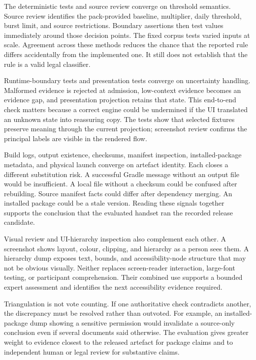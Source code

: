 The deterministic tests and source review converge on threshold semantics. Source review identifies the pack-provided baseline, multiplier, daily threshold, burst limit, and source restrictions. Boundary assertions then test values immediately around those decision points. The fixed corpus tests varied inputs at scale. Agreement across these methods reduces the chance that the reported rule differs accidentally from the implemented one. It still does not establish that the rule is a valid legal classifier.

Runtime-boundary tests and presentation tests converge on uncertainty handling. Malformed evidence is rejected at admission, low-context evidence becomes an evidence gap, and presentation projection retains that state. This end-to-end check matters because a correct engine could be undermined if the UI translated an unknown state into reassuring copy. The tests show that selected fixtures preserve meaning through the current projection; screenshot review confirms the principal labels are visible in the rendered flow.

Build logs, output existence, checksums, manifest inspection, installed-package metadata, and physical launch converge on artefact identity. Each closes a different substitution risk. A successful Gradle message without an output file would be insufficient. A local file without a checksum could be confused after rebuilding. Source manifest facts could differ after dependency merging. An installed package could be a stale version. Reading these signals together supports the conclusion that the evaluated handset ran the recorded release candidate.

Visual review and UI-hierarchy inspection also complement each other. A screenshot shows layout, colour, clipping, and hierarchy as a person sees them. A hierarchy dump exposes text, bounds, and accessibility-node structure that may not be obvious visually. Neither replaces screen-reader interaction, large-font testing, or participant comprehension. Their combined use supports a bounded expert assessment and identifies the next accessibility evidence required.

Triangulation is not vote counting. If one authoritative check contradicts another, the discrepancy must be resolved rather than outvoted. For example, an installed-package dump showing a sensitive permission would invalidate a source-only conclusion even if several documents said otherwise. The evaluation gives greater weight to evidence closest to the released artefact for package claims and to independent human or legal review for substantive claims.

